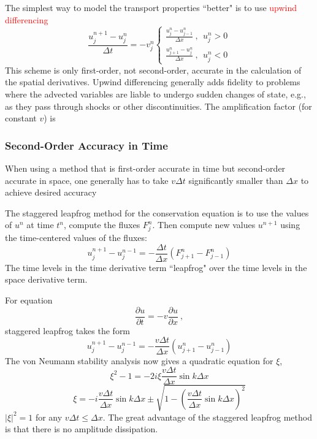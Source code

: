 \documentclass[12pt,a4paper]{article}
\begin{document}
The simplest way to model the transport properties ``better" is to use \textcolor{red}{upwind differencing}
\begin{equation}
\frac{u_{j}^{n+1} -u_{j}^{n} }{\Delta t} = -v_j^n \left\{ 
\begin{aligned}
\frac{u_{j}^{n} -u_{j-1}^{n} }{\Delta x} ~, ~~ u_j^n > 0 \\
\frac{u_{j+1}^{n} -u_{j}^{n} }{\Delta x}~, ~~ u_j^n < 0
\end{aligned}
\right.
\end{equation}
This scheme is only first-order, not second-order, accurate in the calculation of the spatial derivatives. Upwind differencing generally adds fidelity to problems where the advected variables are liable to undergo sudden changes of state, e.g., as they pass through shocks or other discontinuities. The amplification factor (for constant $v$) is





\subsubsection{Second-Order Accuracy in Time}
When using a method that is first-order accurate in time but second-order accurate in space, one generally has to take $v\Delta t$ significantly smaller than $\Delta x$ to achieve desired accuracy

The staggered leapfrog method for the conservation equation is to use the values of $u^n$ at time $t^n$, compute the fluxes $F_j^n$. Then compute new values $u^{n+1}$ using the time-centered values of the fluxes:
\begin{equation}
u_{j}^{n+1} -u_{j}^{n-1} = -\frac{\Delta t}{\Delta x} (F_{j+1}^{n} -F_{j-1}^{n})
\end{equation}
The time levels in the time derivative term ``leapfrog" over the time levels in the space derivative term.

For equation
\begin{equation}
\frac{\partial u}{\partial t} = -v\frac{\partial u}{\partial x} ~,
\end{equation}
staggered leapfrog takes the form
\begin{equation}
u_{j}^{n+1} -u_{j}^{n-1} = -\frac{v \Delta t}{\Delta x} (u_{j+1}^{n} -u_{j-1}^{n})
\end{equation}
The von Neumann stability analysis now gives a quadratic equation for $\xi$,
\begin{equation}
\xi^2 -1 = -2i\xi \frac{v \Delta t}{\Delta x} \sin k \Delta x
\end{equation}
\begin{equation}
\xi = -i \frac{v \Delta t}{\Delta x} \sin k \Delta x \pm \sqrt{1- \left(\frac{v \Delta t}{\Delta x} \sin k \Delta x \right)^2}
\end{equation}
$|\xi|^2 = 1$ for any $v\Delta t \leqslant \Delta x$. The great advantage of the staggered leapfrog method is that there is no amplitude dissipation.
\end{document}
